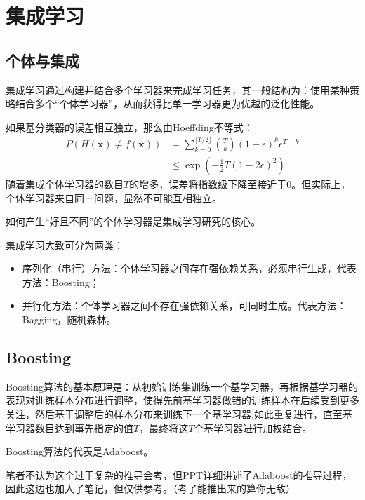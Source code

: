 \chapter{集成学习}

\section{个体与集成}\label{sec:8.1}
集成学习通过构建并结合多个学习器来完成学习任务，其一般结构为：使用某种策略结合多个“个体学习器”，从而获得比单一学习器更为优越的泛化性能。

如果基分类器的误差相互独立，那么由Hoeffding不等式：
\[
\begin{aligned} P(H(\boldsymbol{x}) \neq f(\boldsymbol{x})) & =\sum_{k=0}^{\lfloor T / 2\rfloor}\binom{T}{k}(1-\epsilon)^{k} \epsilon^{T-k} \\ & \leqslant \exp \left(-\frac{1}{2} T(1-2 \epsilon)^{2}\right)\end{aligned}
\]随着集成个体学习器的数目$T$的增多，误差将指数级下降至接近于0。但实际上，个体学习器来自同一问题，显然不可能互相独立。

如何产生“好且不同”的个体学习器是集成学习研究的核心。

集成学习大致可分为两类：
\begin{itemize}
    \item 序列化（串行）方法：个体学习器之间存在强依赖关系，必须串行生成，代表方法：Boosting；
    \item 并行化方法：个体学习器之间不存在强依赖关系，可同时生成。代表方法：Bagging，随机森林。
\end{itemize}

\section{Boosting}\label{sec:8.2}
Boosting算法的基本原理是：从初始训练集训练一个基学习器，再根据基学习器的表现对训练样本分布进行调整，使得先前基学习器做错的训练样本在后续受到更多关注，然后基于调整后的样本分布来训练下一个基学习器;如此重复进行，直至基学习器数目达到事先指定的值$T$，最终将这$T$个基学习器进行加权结合。

Boosting算法的代表是Adaboost。

\begin{Keynote}
笔者不认为这个过于复杂的推导会考，但PPT详细讲述了Adaboost的推导过程，因此这边也加入了笔记，但仅供参考。（考了能推出来的算你无敌）
\end{Keynote}

